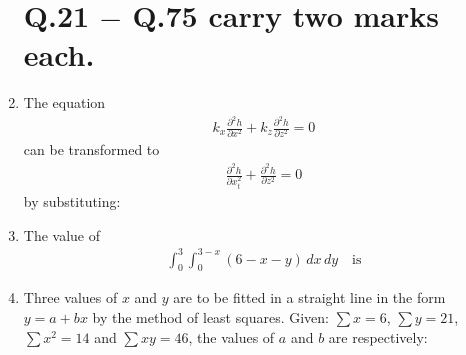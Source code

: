 \documentclass[journal]{IEEEtran}
\begin{document}
\begin{enumerate}
\section*{Q.21 $-$ Q.75 carry two marks each.}

\item The equation 
\begin{align}
k_x \frac{\partial^2 h}{\partial x^2} + k_z \frac{\partial^2 h}{\partial z^2} = 0
\end{align}
can be transformed to \begin{align}
\frac{\partial^2 h}{\partial x_t^2} + \frac{\partial^2 h}{\partial z^2} = 0
\end{align}
by substituting: \hfill {}
\begin{enumerate}
\end{enumerate}

\item The value of 
\begin{align}
\int_0^3 \int_0^{3-x} (6 - x - y) \, dx \, dy \quad \text{is}
\end{align}
\hfill {}
\begin{enumerate}
\end{enumerate}

\item Three values of $x$ and $y$ are to be fitted in a straight line in the form $y = a + bx$ by the method of least squares. Given: $\sum x = 6$, $\sum y = 21$, $\sum x^2 = 14$ and $\sum xy = 46$, the values of $a$ and $b$ are respectively: \hfill {}
\begin{enumerate}
\end{enumerate}


\end{enumerate}
\end{document}
